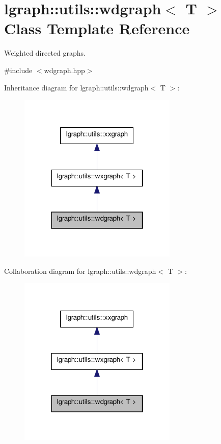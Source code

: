 \hypertarget{classlgraph_1_1utils_1_1wdgraph}{\section{lgraph\-:\-:utils\-:\-:wdgraph$<$ T $>$ Class Template Reference}
\label{classlgraph_1_1utils_1_1wdgraph}
}


Weighted directed graphs.  




{\ttfamily \#include $<$wdgraph.\-hpp$>$}



Inheritance diagram for lgraph\-:\-:utils\-:\-:wdgraph$<$ T $>$\-:\nopagebreak
\begin{figure}[H]
\begin{center}
\leavevmode
\includegraphics[width=214pt]{classlgraph_1_1utils_1_1wdgraph__inherit__graph}
\end{center}
\end{figure}


Collaboration diagram for lgraph\-:\-:utils\-:\-:wdgraph$<$ T $>$\-:\nopagebreak
\begin{figure}[H]
\begin{center}
\leavevmode
\includegraphics[width=214pt]{classlgraph_1_1utils_1_1wdgraph__coll__graph}
\end{center}
\end{figure}
